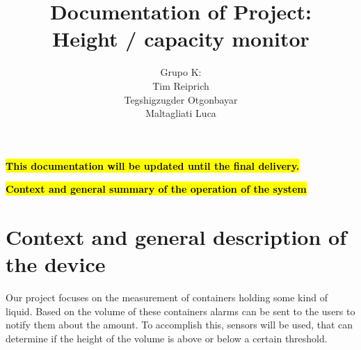 \documentclass{article}
\title{Documentation of Project: \\Height / capacity monitor}
\author{Grupo K: \\ Tim Reiprich \\ Tegshigzugder Otgonbayar \\ Maltagliati Luca}
\begin{document}
\pagestyle{plain}

\maketitle


\newpage

\textcolor{red}{\textbf{\hl{This documentation will be updated until the final delivery.}}}

\tableofcontents %
\newpage




\textcolor{red}{\textbf{\hl{Context and general summary of the operation of the system}}}

\section{Context and general description of the device}

Our project focuses on the measurement of containers holding some kind of
liquid. Based on the volume of these containers alarms can be sent to the users
to notify them about the amount. To accomplish this, sensors will be used, that
can determine if the height of the volume is above or below a certain
threshold. \par
\end{document}
